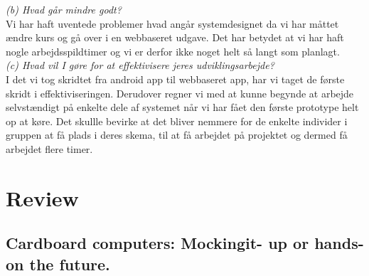 \documentclass[12pt]{article}
\begin{document}
\textit{(b) Hvad går mindre godt?}\\

Vi har haft uventede problemer hvad angår systemdesignet da vi har måttet ændre kurs og gå over i en webbaseret udgave. Det har betydet at vi har haft nogle arbejdsspildtimer og vi er derfor ikke noget helt så langt som planlagt.\\

\textit{(c) Hvad vil I gøre for at effektivisere jeres udviklingsarbejde?}\\

I det vi tog skridtet fra android app til webbaseret app, har vi taget de første skridt i effektiviseringen. Derudover regner vi med at kunne begynde at arbejde selvstændigt på enkelte dele af systemet når vi har fået den første prototype helt op at køre. Det skullle bevirke at det bliver nemmere for de enkelte individer i gruppen at få plads i deres skema, til at få arbejdet på projektet og dermed få arbejdet flere timer. 

\pagebreak
\section{Review}
\subsection{Cardboard computers: Mockingit- up or hands-on the future.}
\end{document}

